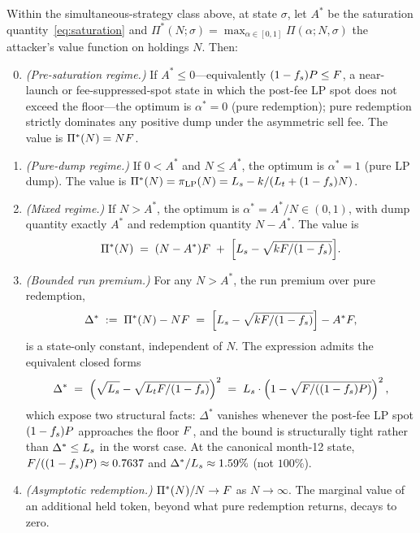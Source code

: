 \begin{theorem}
\label{thm:bank-run}
Within the simultaneous-strategy class above, at state $\sigma$, let $A^*$ be the saturation quantity~\eqref{eq:saturation} and $\Pi^*(N; \sigma) = \max_{\alpha \in [0, 1]} \Pi(\alpha; N, \sigma)$ the attacker's value function on holdings $N$. Then:
\begin{enumerate}
\setcounter{enumi}{-1}
\item \emph{(Pre-saturation regime.)} If $A^* \leq 0$---equivalently $(1 - f_s)P \leq F$, a near-launch or fee-suppressed-spot state in which the post-fee LP spot does not exceed the floor---the optimum is $\alpha^* = 0$ (pure redemption); pure redemption strictly dominates any positive dump under the asymmetric sell fee. The value is $\Pi^*(N) = N F$.
\item \emph{(Pure-dump regime.)} If $0 < A^*$ and $N \leq A^*$, the optimum is $\alpha^* = 1$ (pure LP dump). The value is $\Pi^*(N) = \pi_{\text{LP}}(N) = L_s - k/(L_t + (1 - f_s) N)$.
\item \emph{(Mixed regime.)} If $N > A^*$, the optimum is $\alpha^* = A^*/N \in (0, 1)$, with dump quantity exactly $A^*$ and redemption quantity $N - A^*$. The value is
\begin{equation}
\Pi^*(N) \;=\; (N - A^*) F \;+\; \Big[L_s - \sqrt{k F / (1 - f_s)}\Big].
\label{eq:mixed-value}
\end{equation}
\item \emph{(Bounded run premium.)} For any $N > A^*$, the run premium over pure redemption,
\begin{equation}
\Delta^* \;:=\; \Pi^*(N) - N F \;=\; \Big[L_s - \sqrt{k F / (1 - f_s)}\Big] - A^* F,
\label{eq:run-premium}
\end{equation}
is a state-only constant, independent of $N$. The expression admits the equivalent closed forms
\begin{equation}
\Delta^* \;=\; \left(\sqrt{L_s} - \sqrt{L_t F/(1-f_s)}\right)^2
\;=\; L_s \cdot \left(1 - \sqrt{F/((1-f_s)P)}\right)^2,
\label{eq:run-premium-closed}
\end{equation}
which expose two structural facts: $\Delta^*$ vanishes whenever the post-fee LP spot $(1-f_s)P$ approaches the floor $F$, and the bound is structurally tight rather than $\Delta^* \leq L_s$ in the worst case. At the canonical month-12 state, $F/((1-f_s)P) \approx 0.7637$ and $\Delta^*/L_s \approx 1.59\%$ (not $100\%$).
\item \emph{(Asymptotic redemption.)} $\Pi^*(N) / N \to F$ as $N \to \infty$. The marginal value of an additional held token, beyond what pure redemption returns, decays to zero.
\end{enumerate}
\end{theorem}

